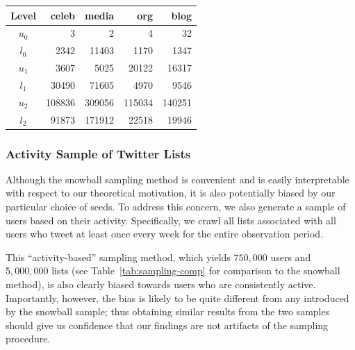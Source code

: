 \documentclass[phd,tocprelim]{cornell}
\renewcommand{\caption}[1]{\singlespacing\hangcaption{#1}\normalspacing}
\begin{document}
\begin{table}
\centering
\begin{scriptsize}
\caption{Snowball Sample}
\label{tab:snowball_sample}
\begin{tabular}{|c|r|r|r|r|}
\hline
Level 		& celeb	& media & org 	& blog \\ \hline
$u_0$		& 3 	& 2 	& 4		& 32 \\ \hline
$l_0$		& 2342 	& 11403	& 1170 	& 1347 \\ \hline \hline
$u_1$		& 3607 	& 5025 	& 20122	& 16317 \\ \hline
$l_1$		& 30490 & 71605	& 4970 	& 9546 \\ \hline \hline
$u_2$		& 108836 & 309056 & 115034 & 140251 \\ \hline
$l_2$		& 91873 & 171912 & 22518 & 19946 \\ \hline
\end{tabular}
\end{scriptsize}
\end{table}


\subsubsection{Activity Sample of Twitter Lists}
Although the snowball sampling method is convenient and is easily
interpretable with respect to our theoretical motivation, it is also
potentially biased by our particular choice of seeds. To address this
concern, we also generate a sample of users based on their
activity. Specifically, we crawl all lists associated with all users who
tweet at least once every week for the entire observation period.

This ``activity-based'' sampling method, which yields $750,000$ users and
$5,000,000$ lists (see Table~\ref{tab:sampling-comp} for comparison to the
snowball method), is also clearly biased towards users who are consistently
active. Importantly, however, the bias is likely to be quite different from
any introduced by the snowball sample; thus obtaining similar results from
the two samples should give us confidence that our findings are not
artifacts of the sampling procedure.
\end{document}
